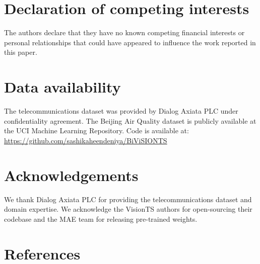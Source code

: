 \documentclass[preprint,12pt,authoryear]{elsarticle}
\begin{document}
\section*{Declaration of competing interests}

The authors declare that they have no known competing financial interests or personal relationships that could have appeared to influence the work reported in this paper.

\section*{Data availability}

The telecommunications dataset was provided by Dialog Axiata PLC under confidentiality agreement. The Beijing Air Quality dataset is publicly available at the UCI Machine Learning Repository. Code is available at: \url{https://github.com/sashikaheendeniya/BiViSIONTS}

\section*{Acknowledgements}

We thank Dialog Axiata PLC for providing the telecommunications dataset and domain expertise. We acknowledge the VisionTS authors for open-sourcing their codebase and the MAE team for releasing pre-trained weights.


\section*{References}

\end{document}
